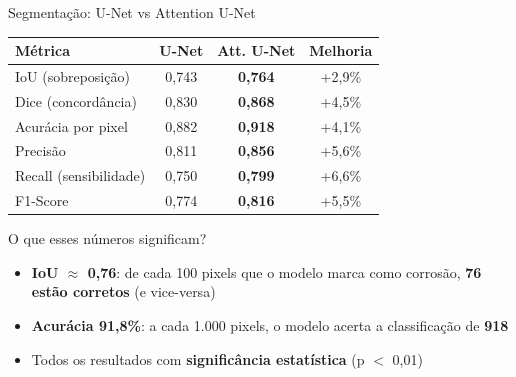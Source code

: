 \documentclass[aspectratio=169, 12pt]{beamer}
\begin{document}
\begin{frame}{Segmentação: U-Net vs Attention U-Net}
    \begin{table}
        \centering
        \small
        \begin{tabular}{l c c c}
            \toprule
            \textbf{Métrica} & \textbf{U-Net} & \textbf{Att. U-Net} & \textbf{Melhoria} \\
            \midrule
            IoU (sobreposição) & 0,743 & \textbf{0,764} & \textcolor{verdepositivo}{+2,9\%} \\
            Dice (concordância) & 0,830 & \textbf{0,868} & \textcolor{verdepositivo}{+4,5\%} \\
            Acurácia por pixel & 0,882 & \textbf{0,918} & \textcolor{verdepositivo}{+4,1\%} \\
            Precisão & 0,811 & \textbf{0,856} & \textcolor{verdepositivo}{+5,6\%} \\
            Recall (sensibilidade) & 0,750 & \textbf{0,799} & \textcolor{verdepositivo}{+6,6\%} \\
            F1-Score & 0,774 & \textbf{0,816} & \textcolor{verdepositivo}{+5,5\%} \\
            \bottomrule
        \end{tabular}
    \end{table}

    \vspace{0.3cm}

    \begin{block}{O que esses números significam?}
        \begin{itemize}
            \item \textbf{IoU $\approx$ 0,76}: de cada 100 pixels que o modelo marca como corrosão, \textbf{76 estão corretos} (e vice-versa)
            \item \textbf{Acurácia 91,8\%}: a cada 1.000 pixels, o modelo acerta a classificação de \textbf{918}
            \item Todos os resultados com \textbf{significância estatística} (p $<$ 0,01)
        \end{itemize}
    \end{block}
\end{frame}
\end{document}
